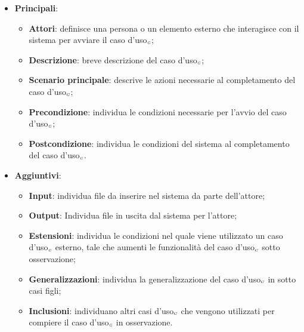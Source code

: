 \begin{itemize}
	\item \textbf{Principali}:
	\begin{itemize}
		\item \textbf{Attori}: definisce una persona o un elemento esterno che interagisce con il sistema per avviare il caso d'uso$_{\scaleto{G}{3pt}}$;
		\item \textbf{Descrizione}: breve descrizione del caso d'uso$_{\scaleto{G}{3pt}}$;
		\item \textbf{Scenario principale}: descrive le azioni necessarie al completamento del caso d'uso$_{\scaleto{G}{3pt}}$;
		\item \textbf{Precondizione}: individua le condizioni necessarie per l'avvio del caso d'uso$_{\scaleto{G}{3pt}}$;
		\item \textbf{Postcondizione}: individua le condizioni del sistema al completamento del caso d'uso$_{\scaleto{G}{3pt}}$.
	\end{itemize}
	\item \textbf{Aggiuntivi}:
	\begin{itemize}
		\item \textbf{Input}: individua file da inserire nel sistema da parte dell'attore;
		\item \textbf{Output}: Individua file in uscita dal sistema per l'attore;
		\item \textbf{Estensioni}: individua le condizioni nel quale viene utilizzato un caso d'uso$_{\scaleto{G}{3pt}}$ esterno, tale che aumenti le funzionalità del caso d'uso$_{\scaleto{G}{3pt}}$ sotto osservazione;
		\item \textbf{Generalizzazioni}: individua la generalizzazione del caso d'uso$_{\scaleto{G}{3pt}}$ in sotto casi figli;
		\item \textbf{Inclusioni}: individuano altri casi d'uso$_{\scaleto{G}{3pt}}$ che vengono utilizzati per compiere il caso d'uso$_{\scaleto{G}{3pt}}$ in osservazione.
	\end{itemize}
\end{itemize}

